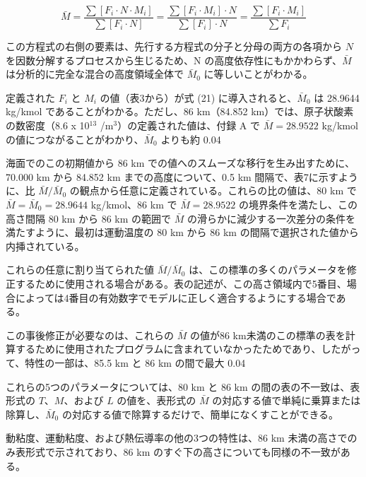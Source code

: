 \documentclass{article}
\begin{document}
\begin{equation}
 \bar{M} = \frac{\sum [F_i \cdot N \cdot M_i]}{\sum [F_i \cdot N]} = \frac{\sum [F_i \cdot M_i] \cdot N}{\sum [F_i] \cdot N} = \frac{\sum [F_i \cdot M_i]}{\sum F_i} \tag{21}
\end{equation}

この方程式の右側の要素は、先行する方程式の分子と分母の両方の各項から $N$ を因数分解するプロセスから生じるため、N の高度依存性にもかかわらず、$\bar{M}$ は分析的に完全な混合の高度領域全体で $\bar{M}_0$ に等しいことがわかる。

定義された $F_i$ と $M_i$ の値（表3から）が式 (21) に導入されると、$\bar{M}_0$ は 28.9644 kg/kmol であることがわかる。ただし、86 km（84.852 km）では、原子状酸素の数密度（8.6 x 10$^{13}$ /m$^3$）の定義された値は、付録 A で $\bar{M} = 28.9522$ kg/kmol の値につながることがわかり、$\bar{M}_0$ よりも約 0.04%

海面でのこの初期値から 86 km での値へのスムーズな移行を生み出すために、70.000 km から 84.852 km までの高度について、0.5 km 間隔で、表7に示すように、比 $\bar{M} / \bar{M}_0$ の観点から任意に定義されている。これらの比の値は、80 km で $\bar{M} = \bar{M}_0 = 28.9644$ kg/kmol、86 km で $\bar{M} = 28.9522$ の境界条件を満たし、この高さ間隔 80 km から 86 km の範囲で $\bar{M}$ の滑らかに減少する一次差分の条件を満たすように、最初は運動温度の 80 km から 86 km の間隔で選択された値から内挿されている。

これらの任意に割り当てられた値 $\bar{M} / \bar{M}_0$ は、この標準の多くのパラメータを修正するために使用される場合がある。表の記述が、この高さ領域内で5番目、場合によっては4番目の有効数字でモデルに正しく適合するようにする場合である。

この事後修正が必要なのは、これらの $\bar{M}$ の値が86 km未満のこの標準の表を計算するために使用されたプログラムに含まれていなかったためであり、したがって、特性の一部は、85.5 km と 86 km の間で最大 0.04%

これらの5つのパラメータについては、80 km と 86 km の間の表の不一致は、表形式の $T$、$M$、および $L$ の値を、表形式の $\bar{M}$ の対応する値で単純に乗算または除算し、$\bar{M}_0$ の対応する値で除算するだけで、簡単になくすことができる。

動粘度、運動粘度、および熱伝導率の他の3つの特性は、86 km 未満の高さでのみ表形式で示されており、86 km のすぐ下の高さについても同様の不一致がある。
\end{document}
